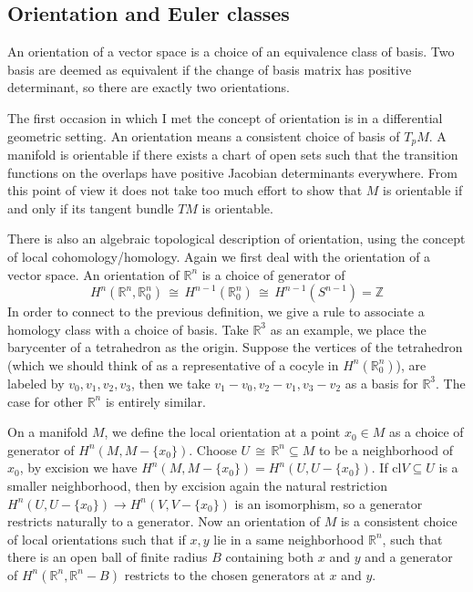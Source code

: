 \documentclass[12pt]{article}
\theoremstyle{plain}
\theoremstyle{definition}
\newcommand{\IR}{\mathbb{R}}
\newcommand{\IZ}{\mathbb{Z}}
\newcommand\iso{\,{\cong}\,}
\newcommand{\<}{\langle}
\renewcommand{\>}{\rangle}
\newcommand{\cl}{\mathrm{cl}}
\begin{document}
\subsection{Orientation and Euler classes}
An orientation of a vector space is a choice of an equivalence class of basis. Two basis are deemed as equivalent if the change of basis matrix has positive determinant, so there are exactly two orientations. 

The first occasion in which I met the concept of orientation is in a differential geometric setting. An orientation means a consistent choice of basis of $T_p M$. A manifold is orientable if there exists a chart of open sets such that the transition functions on the overlaps have positive Jacobian determinants everywhere. From this point of view it does not take too much effort to show that $M$ is orientable if and only if its tangent bundle $TM$ is orientable. 

There is also an algebraic topological description of orientation, using the concept of local cohomology/homology. Again we first deal with the orientation of a vector space. An orientation of $\IR^n$ is a choice of generator of $$H^n(\IR^n, \IR^n_0) \iso H^{n-1}(\IR^n_0) \iso H^{n - 1}(S^{n - 1}) = \IZ$$
In order to connect to the previous definition, we give a rule to associate a homology class with a choice of basis. Take $\IR^3$ as an example, we place the barycenter of a tetrahedron as the origin. Suppose the vertices of the tetrahedron (which we should think of as a representative of a cocyle in $H^n(\IR^n_0)$), are labeled by $v_0, v_1, v_2, v_3$, then we take $v_1 - v_0, v_2 - v_1, v_3 - v_2$ as a basis for $\IR^3$. The case for other $\IR^n$ is entirely similar. 

On a manifold $M$, we define the local orientation at a point $x_0 \in M$ as a choice of generator of $H^n(M, M-\{x_0\})$. Choose $U \iso \IR^n \subseteq M$ to be a neighborhood of $x_0$, by excision we have $H^n(M, M-\{x_0\}) = H^n(U, U-\{x_0\})$. If $\cl{V} \subseteq U$ is a smaller neighborhood, then by excision again the natural restriction $H^n(U, U-\{x_0\}) \to H^n(V, V-\{x_0\})$ is an isomorphism, so a generator restricts naturally to a generator. Now an orientation of $M$ is a consistent choice of local orientations such that if $x, y$ lie in a same neighborhood $\IR^n$, such that there is an open ball of finite radius $B$ containing both $x$ and $y$ and a generator of $H^n(\IR^n, \IR^n - B)$ restricts to the chosen generators at $x$ and $y$. 
\end{document}
